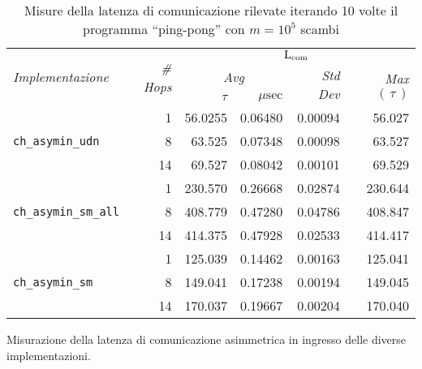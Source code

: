 \begin{table}[!b]
  \begin{subtable}[b]{\textwidth}
    \centering
    \begin{tabular}{|l|r|r|r|r|r|}
      \hline
      \multirow{3}{*}{\emph{Implementazione}} &
      \multirow{3}{4ex}{\emph{\# Hops}} &
      \multicolumn{4}{|c|}{$\mathrm{L}_{\mathrm{com}}$} \\
      \cline{3-6}
      & & \multicolumn{2}{|c|}{\emph{Avg}} &
      \multirow{2}{*}{\emph{Std Dev}} &
      \multirow{2}{*}{\emph{Max} $(\,\tau\,)$} \\
      \cline{3-4}
      & & $\tau$ & $\mu\mathrm{sec}$ & & \\
      \hline
      \multirow{3}{*}{\texttt{ch\_asymin\_udn}}
      & 1 & 56.0255 & 0.06480 & 0.00094 & 56.027 \\
      & 8 & 63.525 & 0.07348 & 0.00098 & 63.527 \\
      & 14 & 69.527 & 0.08042 & 0.00101 & 69.529 \\
      \hline
      \multirow{3}{*}{\texttt{ch\_asymin\_sm\_all}}
      & 1 & 230.570 & 0.26668 & 0.02874 & 230.644 \\
      & 8 & 408.779 & 0.47280 & 0.04786 & 408.847 \\
      & 14 & 414.375 & 0.47928 & 0.02533 & 414.417 \\
      \hline
      \multirow{3}{*}{\texttt{ch\_asymin\_sm}}
      & 1 & 125.039 & 0.14462 & 0.00163 & 125.041 \\
      & 8 & 149.041 & 0.17238 & 0.00194 & 149.045 \\
      & 14 & 170.037 & 0.19667 & 0.00204 & 170.040 \\
      \hline
    \end{tabular}
    \caption{Misurazione della latenza di comunicazione asimmetrica in ingresso delle diverse implementazioni.}
  \end{subtable}

  \caption[Latenza dei canali di comunicazione asimmetrici]{Misure della latenza di comunicazione rilevate iterando 10 volte il programma ``ping-pong'' con $m = 10^5$ scambi }
  \label{tab:meter}
\end{table}

